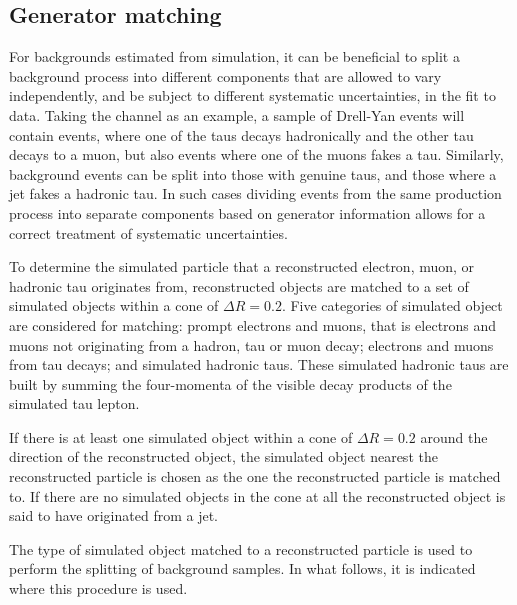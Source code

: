 \subsection{Generator matching}
\label{sec:mssm_bkgs_genmatch}
For backgrounds estimated from simulation, it can be
beneficial to split a background process into different
components that are allowed to vary independently, and be
subject to different systematic uncertainties, in the fit to data.
Taking the \mutau 
channel as an example, a sample of Drell-Yan events
will contain \Ztautau events, where one of the taus decays
hadronically and the other tau decays to a muon, but also
\Zmm events where one of the muons fakes a tau. 
Similarly, \ttbar background
events can be split into those with genuine taus, and those
where a jet fakes a hadronic tau. In such cases dividing
events from the same production process into separate components
based on generator information allows for a correct
treatment of systematic uncertainties.

To determine the simulated particle
that a reconstructed electron, muon, or hadronic tau
originates from, reconstructed objects are matched
to a set of simulated objects within a cone of $\Delta R = 0.2$.
Five categories of simulated object are considered for matching:
prompt electrons and muons,
that is electrons and muons not originating from a hadron, tau or muon decay; electrons and muons
from tau decays; and simulated hadronic taus. These simulated
hadronic taus are built by summing the four-momenta
of the visible decay products of the simulated tau lepton.

If there is at least one simulated object
within a cone of $\Delta R = 0.2$ around the direction of the reconstructed
object, the simulated object nearest the reconstructed particle is chosen
as the one the reconstructed particle is matched to. 
If there are no 
simulated objects in the cone at all the reconstructed object is said to 
have originated from a jet.

The type of simulated object matched to a 
reconstructed particle is used to perform the splitting
of background samples. In what follows, it is indicated where this 
procedure is used.

